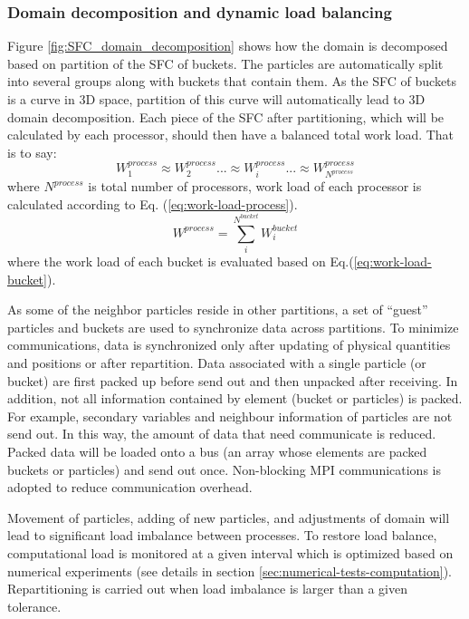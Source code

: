 \subsubsection{Domain decomposition and dynamic load balancing}
Figure \ref{fig:SFC_domain_decomposition} shows how the domain is decomposed based on partition of the SFC of buckets. The particles are automatically split into several groups along with buckets that contain them. As the SFC of buckets is a curve in 3D space, partition of this curve will automatically lead to 3D domain decomposition. Each piece of the SFC after partitioning, which will be calculated by each processor, should then have a balanced total work load. That is to say:
\begin{equation}
W^{process}_1 \approx W^{process}_2 ... \approx W^{process}_i ...\approx W^{process}_{N^{process}}
\label{eq:work-load-balance}
\end{equation}
where $N^{process}$ is total number of processors, work load of each processor is calculated according to Eq. (\ref{eq:work-load-process}).
\begin{equation}
W^{process} = \sum_i^{N^{bucket}} W_i^{bucket}
\label{eq:work-load-process}
\end{equation}
where the work load of each bucket is evaluated based on Eq.(\ref{eq:work-load-bucket}).

As some of the neighbor particles reside in other partitions, a set of ``guest'' particles and buckets are used to synchronize data across partitions. To minimize communications, data is synchronized only after updating of physical quantities and positions or after repartition. Data associated with a single particle (or bucket) are first packed up before send out and then unpacked after receiving. In addition, not all information contained by element (bucket or particles) is packed. For example, secondary variables and neighbour information of particles are not send out. In this way, the amount of data that need communicate is reduced. Packed data will be loaded onto a bus (an array whose elements are packed buckets or particles) and send out once. Non-blocking MPI communications is adopted to reduce communication overhead.

Movement of particles, adding of new particles, and adjustments of domain will lead to significant load imbalance between processes. To restore load balance, computational load is monitored at a given interval which is optimized based on numerical experiments (see details in section \ref{sec:numerical-tests-computation}). Repartitioning is carried out when load imbalance is larger than a given tolerance.

